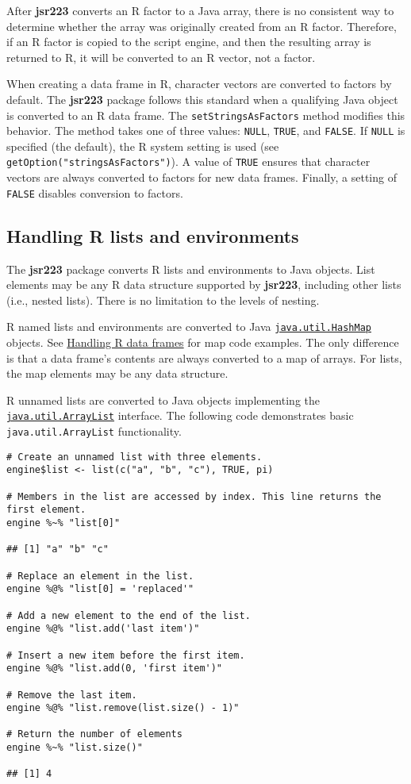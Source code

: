 \documentclass[
article,
11pt, %
a4paper, %
oneside, %
headinclude,footinclude, %
]{scrartcl}
\theoremstyle{definition} %
\theoremstyle{plain} %
\theoremstyle{remark} %
\newcommand{\pkg}[1]{\textbf{#1}}
\newcommand{\code}[1]{\texttt{#1}}
\begin{document}
After \pkg{jsr223} converts an R factor to a Java array, there is no consistent way to determine whether the array was originally created from an R factor. Therefore, if an R factor is copied to the script engine, and then the resulting array is returned to R, it will be converted to an R vector, not a factor.

When creating a data frame in R, character vectors are converted to factors by default. The \pkg{jsr223} package follows this standard when a qualifying Java object is converted to an R data frame. The \code{setStringsAsFactors} method modifies this behavior. The method takes one of three values: \code{NULL}, \code{TRUE}, and \code{FALSE}. If \code{NULL} is specified (the default), the R system setting is used (see \newline\code{getOption("stringsAsFactors")}). A value of \code{TRUE} ensures that character vectors are always converted to factors for new data frames. Finally, a setting of \code{FALSE} disables conversion to factors.

\subsection{Handling R lists and environments}
The \pkg{jsr223} package converts R lists and environments to Java objects. List elements may be any R data structure supported by \pkg{jsr223}, including other lists (i.e., nested lists). There is no limitation to the levels of nesting.

R named lists and environments are converted to Java \href{https://docs.oracle.com/javase/8/docs/api/java/util/HashMap.html}{\code{java.util.HashMap}} objects. See \hyperlink{handling-r-data-frames}{Handling R data frames} for map code examples. The only difference is that a data frame's contents are always converted to a map of arrays. For lists, the map elements may be any data structure.

R unnamed lists are converted to Java objects implementing the \href{https://docs.oracle.com/javase/8/docs/api/java/util/ArrayList.html}{\code{java.util.ArrayList}} interface. The following code demonstrates basic \code{java.util.ArrayList} functionality.

\begin{verbatim}
# Create an unnamed list with three elements.
engine$list <- list(c("a", "b", "c"), TRUE, pi)

# Members in the list are accessed by index. This line returns the first element.
engine %~% "list[0]"

## [1] "a" "b" "c"

# Replace an element in the list.
engine %@% "list[0] = 'replaced'"

# Add a new element to the end of the list.
engine %@% "list.add('last item')"

# Insert a new item before the first item.
engine %@% "list.add(0, 'first item')"

# Remove the last item.
engine %@% "list.remove(list.size() - 1)"

# Return the number of elements
engine %~% "list.size()"

## [1] 4
\end{verbatim}
\end{document}

